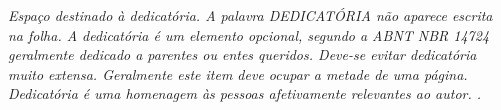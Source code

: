 \begin{dedicatoria}
  \vspace*{\fill}
  \centering
  \noindent
  \textit{Espaço destinado à dedicatória.
  A palavra DEDICATÓRIA não aparece escrita na folha.
  A dedicatória é um elemento opcional, segundo a ABNT NBR 14724 geralmente dedicado a parentes ou entes queridos. Deve-se evitar dedicatória muito extensa. Geralmente este item deve ocupar a metade de uma página. 
  Dedicatória é uma homenagem às pessoas afetivamente relevantes ao autor.
  .} \vspace*{\fill}
\end{dedicatoria}

